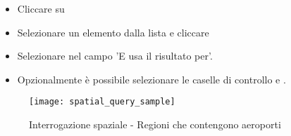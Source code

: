 \begin{itemize}[label=--]
\item Cliccare su 
\item Selezionare un elemento dalla lista e cliccare 
\item Selezionare  nel campo 'E usa il risultato per'.
\item Opzionalmente è possibile selezionare le caselle di controllo  e .
\end{itemize}

\begin{figure}[ht]
   \centering
   \texttt{[image: spatial\_query\_sample]}
   \caption{Interrogazione spaziale - Regioni che contengono aeroporti \wincaption}
   \label{fig:spatialquerysample}
\end{figure}

\FloatBarrier

